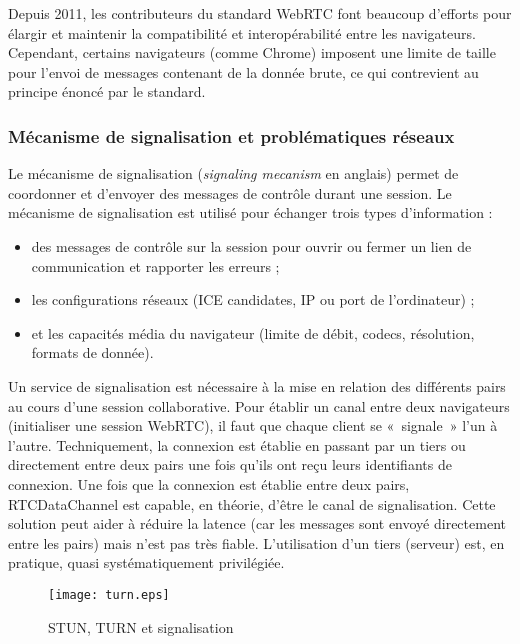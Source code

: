 
Depuis 2011, les contributeurs du standard WebRTC font beaucoup 
d'efforts pour élargir et maintenir la compatibilité et interopérabilité entre les navigateurs.
Cependant, certains navigateurs (comme Chrome) imposent une limite de taille 
pour l'envoi de messages contenant de la donnée brute, ce qui contrevient au 
principe énoncé par le standard.

\subsubsection{Mécanisme de signalisation et problématiques réseaux}
Le mécanisme de signalisation (\textit{signaling mecanism} en anglais) 
permet de coordonner et d'envoyer des messages de contrôle durant une 
session. Le mécanisme de signalisation est utilisé pour échanger trois 
types d'information : 
\begin{itemize}
	\item des messages de contrôle sur la session pour ouvrir ou fermer un 
	lien de communication et rapporter les erreurs ;
	\item les configurations réseaux (ICE candidates, IP ou
	port de l'ordinateur) ; 
	\item et les capacités média du navigateur (limite de débit, codecs, 
	résolution, formats de donnée).
\end{itemize}
Un service de signalisation est nécessaire à la mise en relation des 
différents pairs au cours d'une session collaborative. 
Pour établir un canal entre deux navigateurs (initialiser une session 
WebRTC), il faut que chaque client se «~signale~» l'un à l'autre. 
Techniquement, la connexion est établie en passant par 
un tiers ou directement entre deux pairs une fois qu'ils ont reçu leurs 
identifiants de connexion. 
Une fois que la connexion est établie entre deux pairs, 
RTCDataChannel est capable, en théorie, d'être le canal de signalisation. 
Cette solution peut aider à réduire la latence (car les messages sont 
envoyé directement entre les pairs) mais n'est pas très fiable. L'utilisation 
d'un tiers (serveur) est, en pratique, quasi systématiquement privilégiée.

\begin{figure}[hbt]
	\centering
	\texttt{[image: turn.eps]}
	\caption{STUN, TURN et signalisation}
	\label{fig:turn}
\end{figure} 

